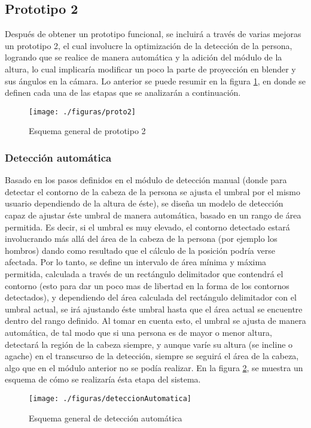 \documentclass[a4paper,openright,12pt]{report}
\begin{document}
\subsection{Prototipo 2}
Después de obtener un prototipo funcional, se incluirá a través de varias mejoras un prototipo 2, el cual involucre la optimización de la detección de la persona, logrando que se realice de manera automática y la adición del módulo de la altura, lo cual implicaría modificar un poco la parte de proyección en blender y sus ángulos en la cámara. Lo anterior se puede resumir en la figura \ref{fig:proto2}, en donde se definen cada una de las etapas que se analizarán a continuación.
\begin{figure}[th]
	\centering
	\texttt{[image: ./figuras/proto2]}
	\caption{Esquema general de prototipo 2} \label{fig:proto2}
\end{figure}

\subsubsection{Detección automática}
Basado en los pasos definidos en el módulo de detección manual (donde para detectar el contorno de la cabeza de la persona se ajusta el umbral por el mismo usuario dependiendo de la altura de éste), se diseña un modelo de detección capaz de ajustar éste umbral de manera automática, basado en un rango de área permitida. Es decir, si el umbral es muy elevado, el contorno detectado estará involucrando más allá del área de la cabeza de la persona (por ejemplo los hombros) dando como resultado que el cálculo de la posición podría verse afectada. Por lo tanto, se define un intervalo de área mínima y máxima permitida, calculada a través de un rectángulo delimitador que contendrá el contorno (esto para dar un poco mas de libertad en la forma de los contornos detectados), y dependiendo del área calculada del rectángulo delimitador con el umbral actual, se irá ajustando éste umbral hasta que el área actual se encuentre dentro del rango definido. Al tomar en cuenta esto, el umbral se ajusta de manera automática, de tal modo que si una persona es de mayor o menor altura, detectará la región de la cabeza siempre, y aunque varíe su altura (se incline o agache) en el transcurso de la detección, siempre se seguirá el área de la cabeza, algo que en el módulo anterior no se podía realizar. En la figura \ref{fig:deteccAutomatica}, se muestra un esquema de cómo se realizaría ésta etapa del sistema.
\begin{figure}[th]
	\centering
	\texttt{[image: ./figuras/deteccionAutomatica]}
	\caption{Esquema general de detección automática} \label{fig:deteccAutomatica}
\end{figure}
\end{document}
